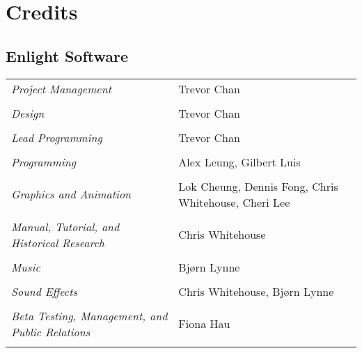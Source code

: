 
\chapter{Credits}

\section{Enlight Software}

\begin{tabular}{p{2in} p{2in}}
	\textit{Project Management} & Trevor Chan \\ \\
	\textit{Design} & Trevor Chan \\ \\
	\textit{Lead Programming} & Trevor Chan \\ \\
	\textit{Programming} & Alex Leung, Gilbert Luis \\ \\
	\textit{Graphics and Animation} & Lok Cheung, Dennis Fong, Chris Whitehouse, Cheri Lee \\ \\
	\textit{Manual, Tutorial, and Historical Research} & Chris Whitehouse \\ \\
	\textit{Music} & Bjørn Lynne \\ \\
	\textit{Sound Effects} & Chris Whitehouse, Bjørn Lynne \\ \\
	\textit{Beta Testing, Management, and Public Relations} & Fiona Hau \\ \\
\end{tabular}

